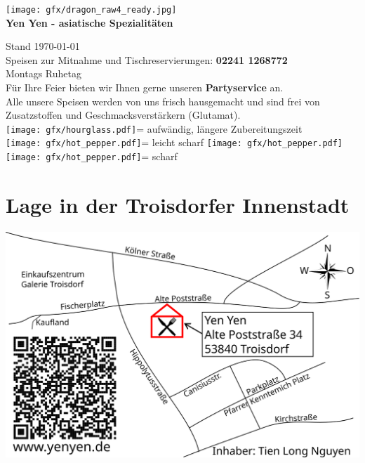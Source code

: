 \documentclass[a4paper,10pt,notumble]{leaflet}
\newcommand{\slow}{\texttt{[image: gfx/hourglass.pdf]}\xspace}
\newcommand{\hotpepper}{\texttt{[image: gfx/hot\_pepper.pdf]}\xspace}
\begin{document}
 
\RaggedRight
{}

\begin{center}
\texttt{[image: gfx/dragon\_raw4\_ready.jpg]}\\[2mm]%
\large{\textbf{Yen Yen - asiatische Spezialitäten}}%
\end{center}%

\begin{center}
{\small Stand \today}\\[2mm]
Speisen zur Mitnahme und Tischreservierungen: \textbf{02241 1268772}\\[1mm]
Montags Ruhetag\\[1mm]
Für Ihre Feier bieten wir Ihnen gerne unseren \textbf{Partyservice} an.\\[2mm]
Alle unsere Speisen werden von uns frisch hausgemacht und sind frei von Zusatzstoffen und Geschmacksverstärkern (Glutamat).\\[2mm]
\slow = aufwändig, längere Zubereitungszeit\\
\hotpepper = leicht scharf \quad \quad \hotpepper\hotpepper = scharf
\end{center}%

\section*{Lage in der Troisdorfer Innenstadt}
\begin{center}
	\includegraphics[width=1.0\textwidth]{gfx/map/tdfcity}
\end{center}
\end{document}
